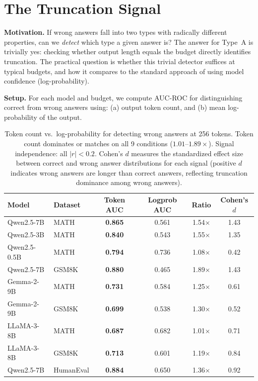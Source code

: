 \documentclass{article}
\begin{document}
\section{The Truncation Signal}

\textbf{Motivation.}
If wrong answers fall into two types with radically different properties, can we \emph{detect} which type a given answer is? The answer for Type~A is trivially yes: checking whether output length equals the budget directly identifies truncation. The practical question is whether this trivial detector suffices at typical budgets, and how it compares to the standard approach of using model confidence (log-probability).

\textbf{Setup.}
For each model and budget, we compute AUC-ROC for distinguishing correct from wrong answers using: (a) output token count, and (b) mean log-probability of the output.

\begin{table}[t]
\centering
\caption{Token count vs.\ log-probability for detecting wrong answers at 256 tokens. Token count dominates or matches on all 9 conditions ($1.01$--$1.89\times$). Signal independence: all $|r| < 0.2$. Cohen's $d$ measures the standardized effect size between correct and wrong answer distributions for each signal (positive $d$ indicates wrong answers are longer than correct answers, reflecting truncation dominance among wrong answers).}
\label{tab:signal}
\begin{tabular}{llcccc}
\toprule
\textbf{Model} & \textbf{Dataset} & \textbf{Token AUC} & \textbf{Logprob AUC} & \textbf{Ratio} & \textbf{Cohen's $d$} \\
\midrule
Qwen2.5-7B & MATH & \textbf{0.865} & 0.561 & 1.54$\times$ & 1.43 \\
Qwen2.5-3B & MATH & \textbf{0.840} & 0.543 & 1.55$\times$ & 1.35 \\
Qwen2.5-0.5B & MATH & \textbf{0.794} & 0.736 & 1.08$\times$ & 0.42 \\
Qwen2.5-7B & GSM8K & \textbf{0.880} & 0.465 & 1.89$\times$ & 1.43 \\
Gemma-2-9B & MATH & \textbf{0.731} & 0.584 & 1.25$\times$ & 0.61 \\
Gemma-2-9B & GSM8K & \textbf{0.699} & 0.538 & 1.30$\times$ & 0.52 \\
LLaMA-3-8B & MATH & \textbf{0.687} & 0.682 & 1.01$\times$ & 0.71 \\
LLaMA-3-8B & GSM8K & \textbf{0.713} & 0.601 & 1.19$\times$ & 0.84 \\
Qwen2.5-7B & HumanEval & \textbf{0.884} & 0.650 & 1.36$\times$ & 0.92 \\
\bottomrule
\end{tabular}
\end{table}
\end{document}
